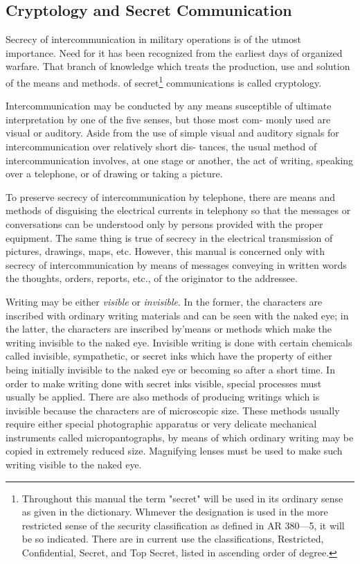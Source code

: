 \subsection{Cryptology and Secret Communication}

\mypara Secrecy of intercommunication in military operations is of the
utmost importance. Need for it has been recognized from the earliest
days of organized warfare. That branch of knowledge which treats the
production, use and solution of the means and methods. of secret\footnote{ Throughout this manual the term "secret" will be used in its ordinary sense as given in the dictionary. Whmever the designation is used in the more restricted sense of the security classiﬁcation as deﬁned in AR 380—5, it will be so indicated. There are in current use the classiﬁcations, Restricted, Conﬁdential, Secret, and Top Secret, listed in ascending order of degree.} communications is called cryptology.


\mypara Intercommunication may be conducted by any means susceptible of
ultimate interpretation by one of the ﬁve senses, but those most com-
monly used are visual or auditory. Aside from the use of simple visual
and auditory signals for intercommunication over relatively short dis-
tances, the usual method of intercommunication involves, at one stage
or another, the act of writing, speaking over a telephone, or of drawing
or taking a picture.

\mypara To preserve secrecy of intercommunication by telephone, there are
means and methods of disguising the electrical currents in telephony so
that the messages or conversations can be understood only by persons
provided with the proper equipment. The same thing is true of secrecy
in the electrical transmission of pictures, drawings, maps, etc. However,
this manual is concerned only with secrecy of intercommunication by
means of messages conveying in written words the thoughts, orders,
reports, etc., of the originator to the addressee.

\mypara Writing may be either \textit{visible} or \textit{invisible}. In the former, the characters are inscribed with ordinary writing materials and can be seen with
the naked eye; in the latter, the characters are inscribed by'means or
methods which make the writing invisible to the naked eye. Invisible
writing is done with certain chemicals called invisible, sympathetic, or
secret inks which have the property of either being initially invisible to
the naked eye or becoming so after a short time. In order to make writing
done with secret inks visible, special processes must usually be applied.
There are also methods of producing writings which is invisible because
the characters are of microscopic size. These methods usually require
either special photographic apparatus or very delicate mechanical instruments called micropantographs, by means of which ordinary writing may
be copied in extremely reduced size. Magnifying lenses must be used to
make such writing visible to the naked eye.

